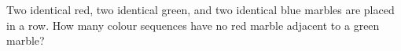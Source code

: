 Two identical red, two identical green, and two identical blue marbles are placed in a row. How many colour sequences have no red marble adjacent to a green marble?
